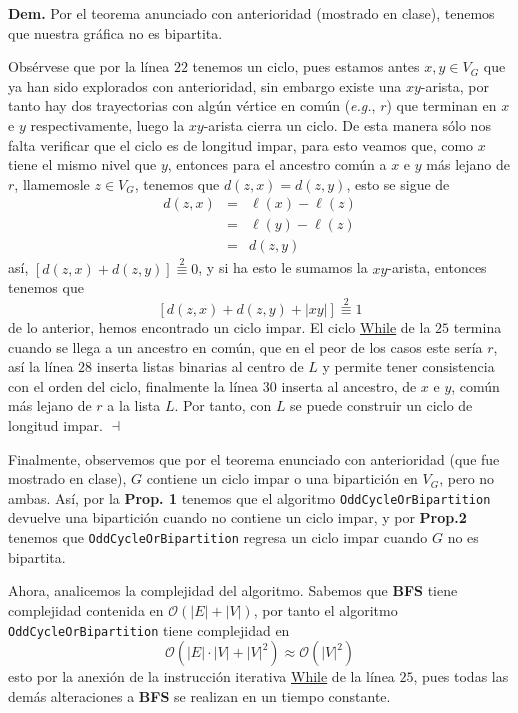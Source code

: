 \documentclass{article}
\newcommand{\code}[1]{\textcolor{white!25!black}{\texttt{#1}}}
\begin{document}
  \textbf{Dem.} Por el teorema anunciado con anterioridad (mostrado en clase), tenemos
  que nuestra gr\'afica no es bipartita.

  Obs\'ervese que por la l\'inea $22$ tenemos un ciclo, pues estamos antes $x,y \in V_G$
  que ya han sido explorados con anterioridad, sin embargo existe una $xy$-arista, por
  tanto hay dos trayectorias con alg\'un v\'ertice en com\'un (\textit{e.g.}, $r$) que terminan
  en $x$ e $y$ respectivamente, luego la $xy$-arista cierra un ciclo. De esta manera s\'olo
  nos falta verificar que el ciclo es de longitud impar, para esto veamos que, como $x$ tiene
  el mismo nivel que $y$, entonces para el ancestro com\'un a $x$ e $y$ m\'as lejano de $r$,
  llamemosle $z \in V_G$, tenemos que $d(z,x) = d(z,y)$, esto se sigue de
  \begin{eqnarray*}
    d(z,x) &=& \ell(x) - \ell(z)\\
    &=& \ell(y) - \ell(z)\\
    &=& d(z,y)
  \end{eqnarray*}
  as\'i, $[d(z,x) + d(z,y)] \stackrel{2}{\equiv}0$, y si ha esto le sumamos la $xy$-arista,
  entonces tenemos que
  \[
  [d(z,x) + d(z,y) + |xy|] \stackrel{2}{\equiv}1
  \]
  de lo anterior, hemos encontrado un ciclo impar. El ciclo \underline{While} de la $25$
  termina cuando se llega a un ancestro en com\'un, que en el peor de los casos este ser\'ia
  $r$, as\'i la l\'inea $28$ inserta listas binarias al centro de $L$ y permite tener consistencia
  con el orden del ciclo, finalmente la l\'inea $30$ inserta al ancestro, de $x$ e $y$, com\'un
  m\'as lejano de $r$ a la lista $L$. Por tanto, con $L$ se puede construir un ciclo de
  longitud impar.
  \hfill $\dashv$

  Finalmente, observemos que por el teorema enunciado con anterioridad (que fue mostrado en clase),
  $G$ contiene un ciclo impar o una bipartici\'on en $V_G$, pero no ambas. As\'i, por la \textbf{Prop. 1}
  tenemos que el algoritmo \code{OddCycleOrBipartition} devuelve una bipartici\'on cuando no contiene
  un ciclo impar, y por \textbf{Prop.2} tenemos que \code{OddCycleOrBipartition} regresa un ciclo
  impar cuando $G$ no es bipartita.

  Ahora, analicemos la complejidad del algoritmo. Sabemos que \textbf{BFS}
  tiene complejidad contenida en $\mathcal{O}(|E| + |V|)$, por tanto el
  algoritmo \code{OddCycleOrBipartition} tiene complejidad en
  \[
  \mathcal{O}(|E|\cdot|V| + |V|^2) \approx \mathcal{O}(|V|^2)
  \]
  esto por la anexi\'on de la instrucci\'on iterativa \underline{While} de
  la l\'inea $25$, pues todas las dem\'as alteraciones a \textbf{BFS} se
  realizan en un tiempo constante.
\end{document}
